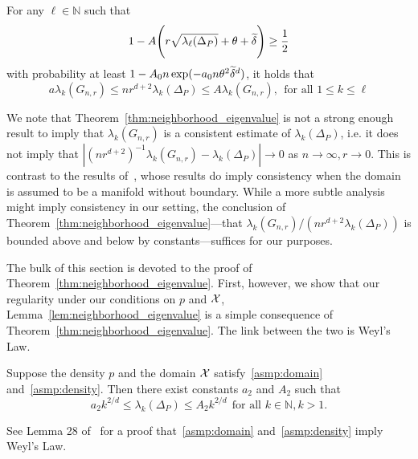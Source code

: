 \begin{theorem}
	\label{thm:neighborhood_eigenvalue}
	For any $\ell \in \mathbb{N}$ such that
	\begin{equation}
	\label{eqn:neighborhood_eigenvalue_1}
	1 - A\Biggl(r \sqrt{\lambda_{\ell}(\Delta_P)} + \theta + \widetilde{\delta}\Biggr)\geq \frac{1}{2}
	\end{equation}
	with probability at least $1 - A_0n\exp(-a_0n\theta^2\widetilde{\delta}^{d})$, it holds that
	\begin{equation}
	\label{eqn:eigenvalue_bound}
	a \lambda_k(G_{n,r}) \leq nr^{d+2} \lambda_k(\Delta_P) \leq A \lambda_k(G_{n,r}),~~\textrm{for all $1 \leq k \leq \ell$}
	\end{equation}
\end{theorem}
We note that Theorem~\ref{thm:neighborhood_eigenvalue} is not a strong enough result to imply that $\lambda_{k}(G_{n,r})$ is a consistent estimate of $\lambda_k(\Delta_P)$, i.e. it does not imply that $|(nr^{d + 2})^{-1}\lambda_{k}(G_{n,r}) - \lambda_k(\Delta_P)| \to 0$ as $n \to \infty, r \to 0$. This is contrast to the results of~\citet{burago2014,trillos2019,calder2019}, whose results do imply consistency when the domain is assumed to be a manifold without boundary. While a more subtle analysis might imply consistency in our setting, the conclusion of Theorem~\ref{thm:neighborhood_eigenvalue}---that $\lambda_k(G_{n,r})/(nr^{d + 2}\lambda_k(\Delta_P))$ is bounded above and below by constants---suffices for our purposes.  

The bulk of this section is devoted to the proof of Theorem~\ref{thm:neighborhood_eigenvalue}. First, however, we show that our regularity under our conditions on $p$ and $\mathcal{X}$, Lemma~\ref{lem:neighborhood_eigenvalue} is a simple consequence of Theorem~\ref{thm:neighborhood_eigenvalue}. The link between the two is Weyl's Law.
\begin{proposition}
	\label{prop:weyl}
	Suppose the density $p$ and the domain $\mathcal{X}$ satisfy~\ref{asmp:domain} and~\ref{asmp:density}. Then there exist constants $a_2$ and $A_2$ such that
	\begin{equation}
	\label{eqn:weyls_law}
	a_2k^{2/d} \leq \lambda_k(\Delta_P) \leq A_2k^{2/d}~~\textrm{for all $k \in \mathbb{N}, k > 1$}.
	\end{equation}
\end{proposition}
See Lemma 28 of~\citet{dunlop2020} for a proof that~\ref{asmp:domain} and~\ref{asmp:density} imply Weyl's Law.

